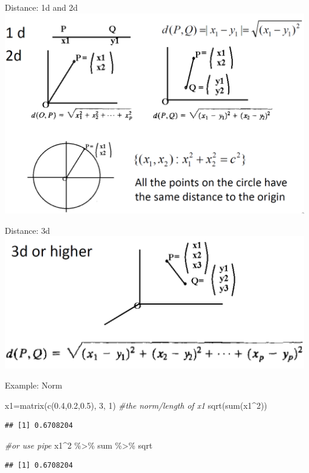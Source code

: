 \documentclass[
  ignorenonframetext,
]{beamer}
\newenvironment{Shaded}{\begin{snugshade}}{\end{snugshade}}
\newcommand{\CommentTok}[1]{\textcolor[rgb]{0.56,0.35,0.01}{\textit{#1}}}
\newcommand{\DecValTok}[1]{\textcolor[rgb]{0.00,0.00,0.81}{#1}}
\newcommand{\FloatTok}[1]{\textcolor[rgb]{0.00,0.00,0.81}{#1}}
\newcommand{\FunctionTok}[1]{\textcolor[rgb]{0.00,0.00,0.00}{#1}}
\newcommand{\NormalTok}[1]{#1}
\newcommand{\OtherTok}[1]{\textcolor[rgb]{0.56,0.35,0.01}{#1}}
\newcommand{\SpecialCharTok}[1]{\textcolor[rgb]{0.00,0.00,0.00}{#1}}
\begin{document}
\begin{frame}{Distance: 1d and 2d}
\protect\hypertarget{distance-1d-and-2d}{}
\includegraphics[width=0.7\linewidth]{img/Distance1d2d}
\end{frame}

\begin{frame}{Distance: 3d}
\protect\hypertarget{distance-3d}{}
\includegraphics[width=0.8\linewidth]{img/Distance3d}
\end{frame}

\begin{frame}[fragile]{Example: Norm}
\protect\hypertarget{example-norm}{}
\begin{Shaded}
\begin{Highlighting}[]
\NormalTok{x1}\OtherTok{=}\FunctionTok{matrix}\NormalTok{(}\FunctionTok{c}\NormalTok{(}\FloatTok{0.4}\NormalTok{,}\FloatTok{0.2}\NormalTok{,}\FloatTok{0.5}\NormalTok{), }\DecValTok{3}\NormalTok{, }\DecValTok{1}\NormalTok{)}
\CommentTok{\#the norm/length of x1}
\FunctionTok{sqrt}\NormalTok{(}\FunctionTok{sum}\NormalTok{(x1}\SpecialCharTok{\^{}}\DecValTok{2}\NormalTok{))}
\end{Highlighting}
\end{Shaded}

\begin{verbatim}
## [1] 0.6708204
\end{verbatim}

\begin{Shaded}
\begin{Highlighting}[]
\CommentTok{\#or use pipe}
\NormalTok{x1}\SpecialCharTok{\^{}}\DecValTok{2} \SpecialCharTok{\%\textgreater{}\%}\NormalTok{ sum }\SpecialCharTok{\%\textgreater{}\%}\NormalTok{ sqrt}
\end{Highlighting}
\end{Shaded}

\begin{verbatim}
## [1] 0.6708204
\end{verbatim}
\end{frame}
\end{document}
